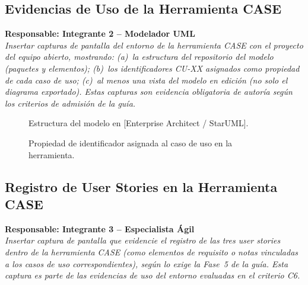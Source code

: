 \documentclass[journal,onecolumn]{IEEEtran}
\newcommand{\guia}[2]{%
  \begin{mdframed}[style=guia]
    \noindent\textbf{Responsable: #1}\\[2pt]
    \textit{#2}
  \end{mdframed}
}
\begin{document}
\subsection{Evidencias de Uso de la Herramienta CASE}
\label{app:case}

\guia{Integrante 2 -- Modelador UML}{%
Insertar capturas de pantalla del entorno de la herramienta CASE con el
proyecto del equipo abierto, mostrando: (a)~la estructura del repositorio
del modelo (paquetes y elementos); (b)~los identificadores CU-XX asignados
como propiedad de cada caso de uso; (c)~al menos una vista del modelo
en edición (no solo el diagrama exportado).
Estas capturas son evidencia obligatoria de autoría según los criterios
de admisión de la guía.}

\begin{figure}[H]
  \centering
  \caption{Estructura del modelo en [Enterprise Architect / StarUML].}
  \label{fig:case1}
\end{figure}

\begin{figure}[H]
  \centering
  \caption{Propiedad de identificador asignada al caso de uso en la herramienta.}
  \label{fig:case2}
\end{figure}

\subsection{Registro de User Stories en la Herramienta CASE}
\label{app:us_case}

\guia{Integrante 3 -- Especialista Ágil}{%
Insertar captura de pantalla que evidencie el registro de las tres user
stories dentro de la herramienta CASE (como elementos de requisito o notas
vinculadas a los casos de uso correspondientes), según lo exige la Fase~5
de la guía. Esta captura es parte de las evidencias de uso del entorno
evaluadas en el criterio C6.}
\end{document}
